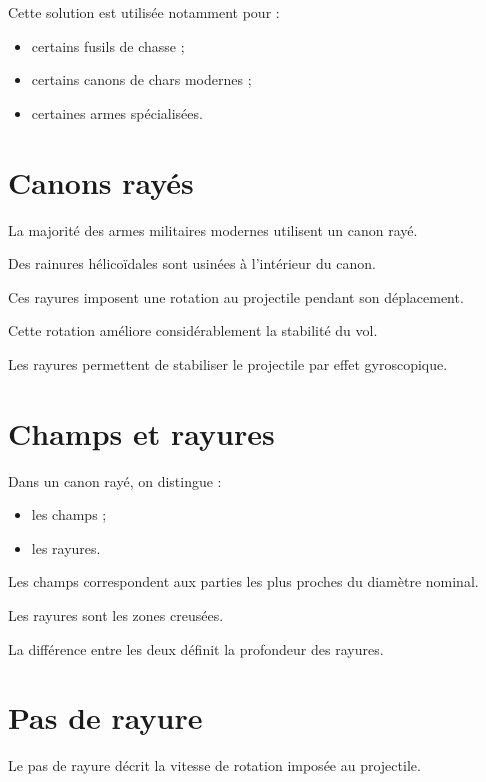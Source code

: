 Cette solution est utilisée notamment pour :

\begin{itemize}
    \item certains fusils de chasse ;
    \item certains canons de chars modernes ;
    \item certaines armes spécialisées.
\end{itemize}

\section{Canons rayés}

La majorité des armes militaires modernes utilisent un canon rayé.

Des rainures hélicoïdales sont usinées à l'intérieur du canon.

Ces rayures imposent une rotation au projectile pendant son déplacement.

Cette rotation améliore considérablement la stabilité du vol.

\begin{aretenir}

Les rayures permettent de stabiliser le projectile par effet gyroscopique.

\end{aretenir}

\section{Champs et rayures}

Dans un canon rayé, on distingue :

\begin{itemize}
    \item les champs ;
    \item les rayures.
\end{itemize}

Les champs correspondent aux parties les plus proches du diamètre nominal.

Les rayures sont les zones creusées.

La différence entre les deux définit la profondeur des rayures.

\section{Pas de rayure}

Le pas de rayure décrit la vitesse de rotation imposée au projectile.


